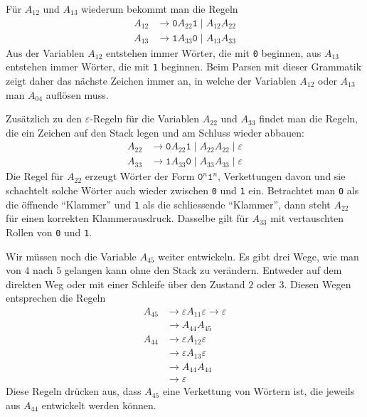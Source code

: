 \begin{loesung}
Für $A_{12}$ und $A_{13}$ wiederum bekommt man die Regeln
\begin{equation}
\begin{aligned}
A_{12}&\to\texttt{0} A_{22}\texttt{1} \;|\; A_{12}A_{22}\\
A_{13}&\to\texttt{1} A_{33}\texttt{0} \;|\; A_{13}A_{33}
\end{aligned}
\label{40000041:a12a13}
\end{equation}
Aus der Variablen $A_{12}$ entstehen immer Wörter, die mit \texttt{0}
beginnen, aus $A_{13}$ entstehen immer Wörter, die mit \texttt{1}
beginnen.
Beim Parsen mit dieser Grammatik zeigt daher das nächste Zeichen
immer an, in welche der Variablen $A_{12}$ oder $A_{13}$ man $A_{04}$
auflösen muss.

Zusätzlich zu den $\varepsilon$-Regeln für die Variablen $A_{22}$ und $A_{33}$
findet man die Regeln, die ein Zeichen auf den Stack legen und am
Schluss wieder abbauen:
\begin{equation}
\begin{aligned}
A_{22}&\to \texttt{0}A_{22}\texttt{1} \;|\; A_{22}A_{22} \;|\; \varepsilon\\
A_{33}&\to \texttt{1}A_{33}\texttt{0} \;|\; A_{33}A_{33} \;|\; \varepsilon
\end{aligned}
\label{40000041:a22a33}
\end{equation}
Die Regel für $A_{22}$ erzeugt Wörter der Form
$\texttt{0}^n\texttt{1}^n$,
Verkettungen davon und sie schachtelt solche Wörter auch wieder zwischen
\texttt{0} und \texttt{1} ein.
Betrachtet man \texttt{0} als die öffnende ``Klammer'' und \texttt{1}
als die schliessende ``Klammer'', dann steht $A_{22}$ für einen
korrekten Klammerausdruck.
Dasselbe gilt für $A_{33}$ mit vertauschten Rollen von \texttt{0}
und \texttt{1}.

Wir müssen noch die Variable $A_{45}$ weiter entwickeln. Es gibt
drei Wege, wie man von $4$ nach $5$ gelangen kann ohne den
Stack zu verändern. Entweder auf dem direkten Weg oder mit
einer Schleife über den Zustand $2$ oder $3$.
Diesen Wegen entsprechen die Regeln
\begin{align*}
A_{45}&\to\varepsilon A_{11}\varepsilon\to\varepsilon\\
      &\to A_{44}A_{45}\\
A_{44}&\to\varepsilon A_{12}\varepsilon\\
      &\to\varepsilon A_{13}\varepsilon\\
      &\to A_{44}A_{44}\\
      &\to\varepsilon
\end{align*}
Diese Regeln drücken aus, dass $A_{45}$ eine Verkettung von Wörtern
ist, die jeweils aus $A_{44}$ entwickelt werden können.


\end{loesung}
